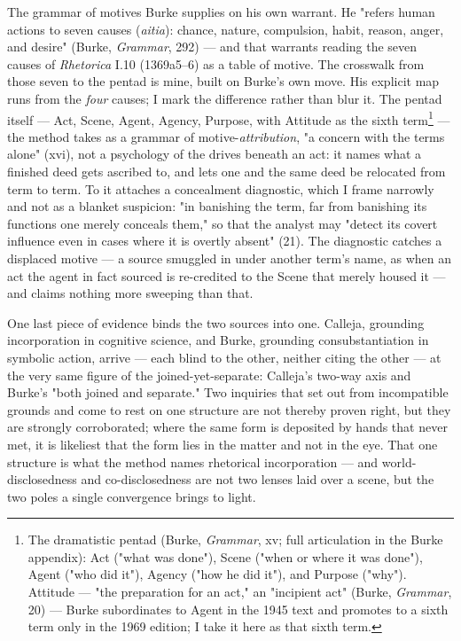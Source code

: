\documentclass{article}
\begin{document}
The grammar of motives Burke supplies on his own warrant. He "refers human actions to seven causes (\textit{aitia}): chance, nature, compulsion, habit, reason, anger, and desire" (Burke, \textit{Grammar}, 292) — and that warrants reading the seven causes of \textit{Rhetorica} I.10 (1369a5–6) as a table of motive. The crosswalk from those seven to the pentad is mine, built on Burke's own move. His explicit map runs from the \textit{four} causes; I mark the difference rather than blur it. The pentad itself — Act, Scene, Agent, Agency, Purpose, with Attitude as the sixth term\footnote{The dramatistic pentad (Burke, \textit{Grammar}, xv; full articulation in the Burke appendix): Act ("what was done"), Scene ("when or where it was done"), Agent ("who did it"), Agency ("how he did it"), and Purpose ("why"). Attitude — "the preparation for an act," an "incipient act" (Burke, \textit{Grammar}, 20) — Burke subordinates to Agent in the 1945 text and promotes to a sixth term only in the 1969 edition; I take it here as that sixth term.} — the method takes as a grammar of motive-\textit{attribution}, "a concern with the terms alone" (xvi), not a psychology of the drives beneath an act: it names what a finished deed gets ascribed to, and lets one and the same deed be relocated from term to term. To it attaches a concealment diagnostic, which I frame narrowly and not as a blanket suspicion: "in banishing the term, far from banishing its functions one merely conceals them," so that the analyst may "detect its covert influence even in cases where it is overtly absent" (21). The diagnostic catches a displaced motive — a source smuggled in under another term's name, as when an act the agent in fact sourced is re-credited to the Scene that merely housed it — and claims nothing more sweeping than that.

One last piece of evidence binds the two sources into one. Calleja, grounding incorporation in cognitive science, and Burke, grounding consubstantiation in symbolic action, arrive — each blind to the other, neither citing the other — at the very same figure of the joined-yet-separate: Calleja's two-way axis and Burke's "both joined and separate." Two inquiries that set out from incompatible grounds and come to rest on one structure are not thereby proven right, but they are strongly corroborated; where the same form is deposited by hands that never met, it is likeliest that the form lies in the matter and not in the eye. That one structure is what the method names rhetorical incorporation — and world-disclosedness and co-disclosedness are not two lenses laid over a scene, but the two poles a single convergence brings to light.
\end{document}
